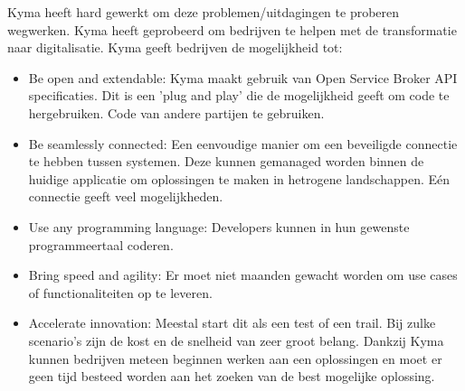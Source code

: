 Kyma heeft hard gewerkt om deze problemen/uitdagingen te proberen  wegwerken. Kyma heeft geprobeerd om bedrijven te helpen met de transformatie naar digitalisatie. Kyma geeft bedrijven de mogelijkheid tot:
\begin{itemize}
	\item Be open and extendable: Kyma maakt gebruik van Open Service Broker API specificaties. Dit is een 'plug and play' die de mogelijkheid geeft om code te hergebruiken. Code van andere partijen te gebruiken. 
	\item Be seamlessly connected: Een eenvoudige manier om een beveiligde connectie te hebben tussen systemen. Deze kunnen gemanaged worden binnen de huidige applicatie om oplossingen te maken in hetrogene landschappen. Eén connectie geeft veel mogelijkheden.
	\item Use any programming language: Developers kunnen in hun gewenste programmeertaal coderen.
	\item Bring speed and agility: Er moet niet maanden gewacht worden om use cases of functionaliteiten op te leveren. 
	\item Accelerate innovation: Meestal start dit als een test of een trail. Bij zulke scenario's zijn de kost en de snelheid van zeer groot belang. Dankzij Kyma kunnen bedrijven meteen beginnen werken aan een oplossingen en moet er geen tijd besteed worden aan het zoeken van de best mogelijke oplossing. 
\end{itemize}


